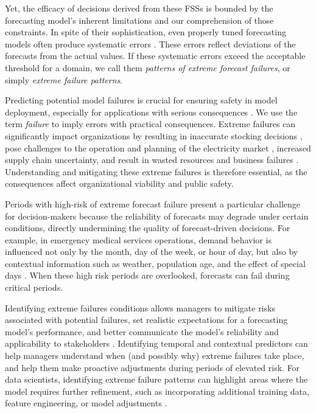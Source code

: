 \documentclass[12pt]{article}
\begin{document}
Yet, the efficacy of decisions derived from these FSSs is bounded by the forecasting model’s inherent limitations and our comprehension of those constraints. In spite of their sophistication, even properly tuned forecasting models often produce systematic errors \citep{eyuboglu2022}. These errors reflect deviations of the forecasts from the actual values. If these systematic errors exceed the acceptable threshold for a domain, we call them \emph{patterns of extreme forecast failures}, or simply %
\emph{extreme failure patterns}.

Predicting potential model failures is crucial for ensuring safety in model deployment, especially for applications with serious consequences \citep{tsiligkaridis2021}. We use the term \emph{failure} to imply errors with practical consequences. Extreme failures can significantly impact organizations by resulting in inaccurate stocking decisions \citep{boylan2021}, pose challenges to the operation and planning of the electricity market \citep{zhu2025}, %
increased supply chain uncertainty, and result in wasted resources and business failures \citep{chae2024}. Understanding and mitigating these extreme failures is therefore essential, as the consequences affect %
organizational viability and public safety.

Periods with high-risk of extreme forecast failure present a particular challenge for decision-makers because the reliability of forecasts may degrade under certain conditions, directly undermining the quality of forecast-driven decisions. For example, in emergency medical services operations, demand behavior is influenced not only by the month, day of the week, or hour of  day, but also by contextual information such as weather, population age, and the effect of special days \citep{abreu2023}. When these high risk periods are overlooked, forecasts can fail during critical periods.

Identifying extreme failures conditions allows managers to mitigate risks associated with potential failures, set realistic expectations for a forecasting model's performance, and better communicate the model's reliability and applicability to stakeholders \citep{cakmak2024}. Identifying temporal and contextual predictors can help managers understand when (and possibly why) extreme failures take place, and help them make proactive adjustments during periods of elevated risk. For data scientists, identifying extreme failure patterns can highlight areas where the model requires further refinement, such as incorporating additional training data, feature engineering, or model adjustments \citep{cakmak2024}. 
\end{document}
